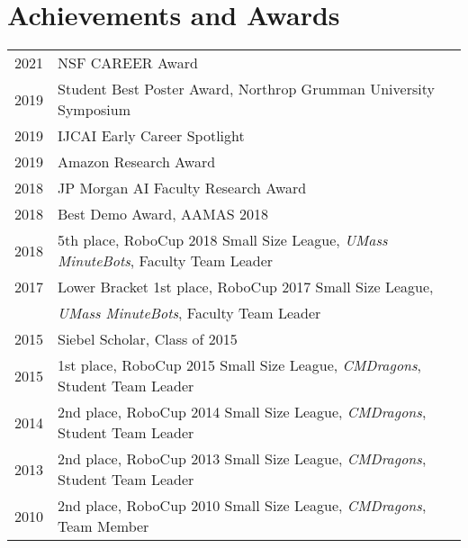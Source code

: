 \documentclass[Times]{article}
\begin{document}
\section*{Achievements and Awards}
\begin{tabular}{ p{1.2cm} l }
  2021  & NSF CAREER Award\\
  2019  & Student Best Poster Award, Northrop Grumman University Symposium \\
  2019  & IJCAI Early Career Spotlight \\
  2019  & Amazon Research Award \\
  2018  & JP Morgan AI Faculty Research Award \\
  2018  & Best Demo Award, AAMAS 2018 \\
  2018  & 5th place, RoboCup 2018 Small Size League,
      \emph{UMass MinuteBots}, Faculty Team Leader\\
  2017  & Lower Bracket 1st place, RoboCup 2017 Small Size League, \\
      &\emph{UMass MinuteBots}, Faculty Team Leader\\
  2015  & Siebel Scholar, Class of 2015 \\
  2015  & 1st place, RoboCup 2015 Small Size League,
     \emph{CMDragons}, Student Team Leader\\
  2014  & 2nd place, RoboCup 2014 Small Size League,
     \emph{CMDragons}, Student Team Leader\\
  2013  & 2nd place, RoboCup 2013 Small Size League,
     \emph{CMDragons}, Student Team Leader\\
  2010  & 2nd place, RoboCup 2010 Small Size League,
     \emph{CMDragons}, Team Member\\
\end{tabular}



%
\end{document}
